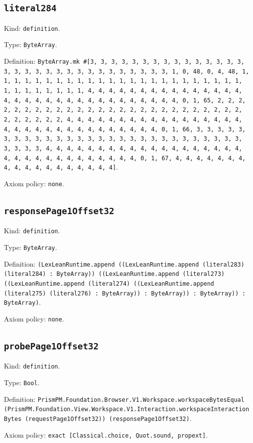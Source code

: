 \documentclass[11pt]{article}
\begin{document}
\subsection*{\texttt{literal284}}
\noindent Kind: \texttt{definition}.\par
\noindent Type: \texttt{ByteArray}.\par
\noindent Definition: \texttt{ByteArray.mk \#[3, 3, 3, 3, 3, 3, 3, 3, 3, 3, 3, 3, 3, 3, 3, 3, 3, 3, 3, 3, 3, 3, 3, 3, 3, 3, 3, 3, 3, 3, 3, 1, 0, 48, 0, 4, 48, 1, 1, 1, 1, 1, 1, 1, 1, 1, 1, 1, 1, 1, 1, 1, 1, 1, 1, 1, 1, 1, 1, 1, 1, 1, 1, 1, 1, 1, 1, 1, 1, 4, 4, 4, 4, 4, 4, 4, 4, 4, 4, 4, 4, 4, 4, 4, 4, 4, 4, 4, 4, 4, 4, 4, 4, 4, 4, 4, 4, 4, 4, 4, 4, 0, 1, 65, 2, 2, 2, 2, 2, 2, 2, 2, 2, 2, 2, 2, 2, 2, 2, 2, 2, 2, 2, 2, 2, 2, 2, 2, 2, 2, 2, 2, 2, 2, 2, 2, 4, 4, 4, 4, 4, 4, 4, 4, 4, 4, 4, 4, 4, 4, 4, 4, 4, 4, 4, 4, 4, 4, 4, 4, 4, 4, 4, 4, 4, 4, 4, 4, 0, 1, 66, 3, 3, 3, 3, 3, 3, 3, 3, 3, 3, 3, 3, 3, 3, 3, 3, 3, 3, 3, 3, 3, 3, 3, 3, 3, 3, 3, 3, 3, 3, 3, 3, 4, 4, 4, 4, 4, 4, 4, 4, 4, 4, 4, 4, 4, 4, 4, 4, 4, 4, 4, 4, 4, 4, 4, 4, 4, 4, 4, 4, 4, 4, 4, 4, 0, 1, 67, 4, 4, 4, 4, 4, 4, 4, 4, 4, 4, 4, 4, 4, 4, 4, 4, 4, 4]}.\par
\noindent Axiom policy: \texttt{none}.\par
\subsection*{\texttt{responsePage1Offset32}}
\noindent Kind: \texttt{definition}.\par
\noindent Type: \texttt{ByteArray}.\par
\noindent Definition: \texttt{(LexLeanRuntime.append ((LexLeanRuntime.append (literal283) (literal284) : ByteArray)) ((LexLeanRuntime.append (literal273) ((LexLeanRuntime.append (literal274) ((LexLeanRuntime.append (literal275) (literal276) : ByteArray)) : ByteArray)) : ByteArray)) : ByteArray)}.\par
\noindent Axiom policy: \texttt{none}.\par
\subsection*{\texttt{probePage1Offset32}}
\noindent Kind: \texttt{definition}.\par
\noindent Type: \texttt{Bool}.\par
\noindent Definition: \texttt{PrismPM.Foundation.Browser.V1.Workspace.workspaceBytesEqual (PrismPM.Foundation.View.Workspace.V1.Interaction.workspaceInteractionBytes (requestPage1Offset32)) (responsePage1Offset32)}.\par
\noindent Axiom policy: \texttt{exact [Classical.choice, Quot.sound, propext]}.\par
\end{document}
